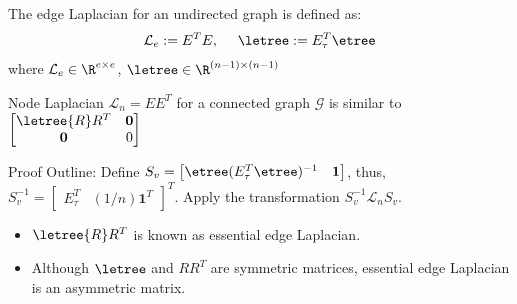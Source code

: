 \begin{frame}
		\begin{defi}
		The edge Laplacian for an undirected graph is defined as:  $$\mathcal{L}_{e}:= E^TE,~~~~\letree:= E_\tau^T \etree$$
		where $\mathcal{L}_{e} \in \R^{e \times e}$, $\letree \in \R^{(n-1) \times (n-1)}$
	\end{defi}
			\begin{lemma}
				Node Laplacian $\mathcal{L}_{n}=EE^T$ for a connected graph $\mathcal{G}$ is similar to $\begin{bmatrix}
					\letree {R}R^T & \textbf{0} \\
					\textbf{0} & 0
				\end{bmatrix}$
			\end{lemma}	
			Proof Outline: Define $S_v=\begin{bmatrix}
				\etree(E_{\tau}^T\etree)^{-1} & \mathbf{1}
			\end{bmatrix}$, thus, $S_v^{-1}=\begin{bmatrix}
				E_{\tau}^T & (1/n)\mathbf{1}^T \end{bmatrix}^T$. Apply the transformation $S_v^{-1}\mathcal{L}_{n}S_v$.					
	\begin{alertblock}{}
		\begin{itemize}
			\item $\letree {R}R^T$ is known as essential edge Laplacian.
			\item Although $\letree$ and $RR^T$ are symmetric matrices, essential edge Laplacian is an asymmetric matrix.
		\end{itemize}
	\end{alertblock}
\end{frame}


